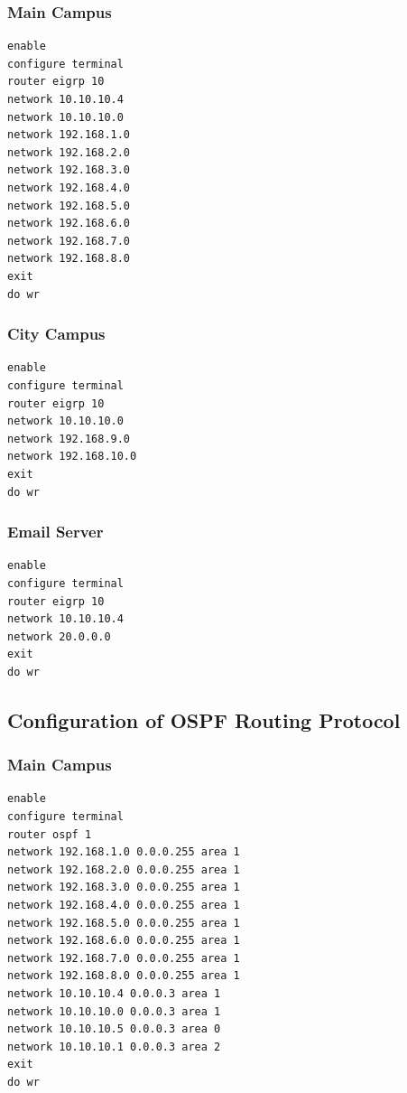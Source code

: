 \documentclass[12pt]{article}
\begin{document}
\subsubsection{Main Campus}
\begin{verbatim}
enable
configure terminal
router eigrp 10
network 10.10.10.4
network 10.10.10.0
network 192.168.1.0
network 192.168.2.0
network 192.168.3.0
network 192.168.4.0
network 192.168.5.0
network 192.168.6.0
network 192.168.7.0
network 192.168.8.0
exit
do wr
\end{verbatim}

\subsubsection{City Campus}
\begin{verbatim}
enable
configure terminal
router eigrp 10
network 10.10.10.0
network 192.168.9.0
network 192.168.10.0
exit
do wr
\end{verbatim}

\subsubsection{Email Server}
\begin{verbatim}
enable
configure terminal
router eigrp 10
network 10.10.10.4
network 20.0.0.0
exit
do wr

\end{verbatim}






\subsection{Configuration of OSPF Routing Protocol}
\subsubsection{Main Campus}
\begin{verbatim}
enable
configure terminal
router ospf 1
network 192.168.1.0 0.0.0.255 area 1
network 192.168.2.0 0.0.0.255 area 1
network 192.168.3.0 0.0.0.255 area 1
network 192.168.4.0 0.0.0.255 area 1
network 192.168.5.0 0.0.0.255 area 1
network 192.168.6.0 0.0.0.255 area 1
network 192.168.7.0 0.0.0.255 area 1
network 192.168.8.0 0.0.0.255 area 1
network 10.10.10.4 0.0.0.3 area 1
network 10.10.10.0 0.0.0.3 area 1
network 10.10.10.5 0.0.0.3 area 0
network 10.10.10.1 0.0.0.3 area 2
exit
do wr




\end{verbatim}
\end{document}

